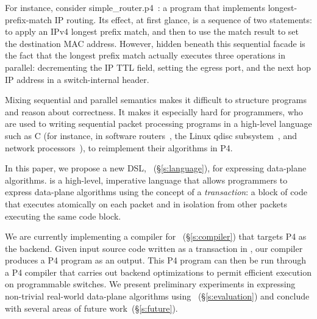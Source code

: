 For instance, consider simple\_router.p4~\cite{simple_router.p4}: a program
that implements longest-prefix-match IP routing. Its effect, at first glance,
is a sequence of two statements: to apply an IPv4 longest prefix match, and
then to use the match result  to set the destination MAC address. However,
hidden beneath this sequential facade is the fact that the longest prefix match
actually executes three operations in parallel: decrementing the IP TTL field,
setting the egress port, and the next hop IP address in a switch-internal
header.

Mixing sequential and parallel semantics makes it difficult to structure
programs and reason about correctness. It makes it especially hard for
programmers, who are used to writing sequential packet processing programs in a
high-level language such as C (for instance, in software routers~\cite{click,
intel_multicore}, the Linux qdisc subsystem~\cite{qdisc}, and network
processors~\cite{npu}), to reimplement their algorithms in P4.

In this paper, we propose a new DSL, \pktlanguage~(\S\ref{s:language}), for
expressing data-plane algorithms. \pktlanguage is a high-level, imperative
language that allows programmers to express data-plane algorithms using the
concept of a {\em transaction}: a block of code that executes atomically on
each packet and in isolation from other packets executing the same code block.


%

We are currently implementing a compiler for \pktlanguage~(\S\ref{s:compiler})
that targets P4 as the backend. Given input source code written as a
transaction in \pktlanguage, our compiler produces a P4 program as an output.
This P4 program can then be run through a P4 compiler that carries out backend
optimizations to permit efficient execution on programmable switches.  We
present preliminary experiments in expressing non-trivial real-world data-plane
algorithms using \pktlanguage~(\S\ref{s:evaluation}) and conclude with several
areas of future work~(\S\ref{s:future}).
